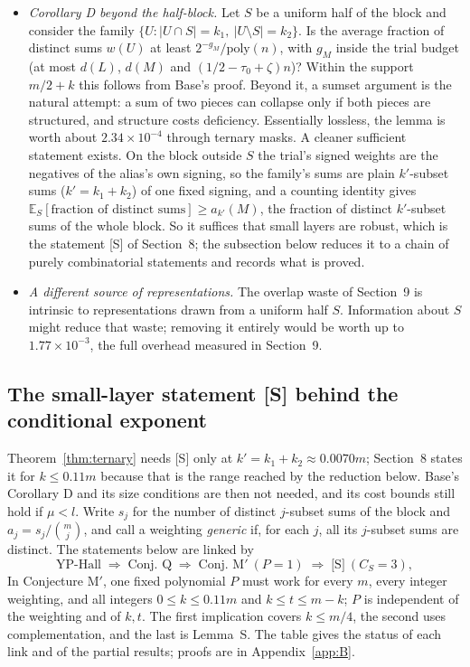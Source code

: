 \documentclass[11pt]{article}
\newcommand{\E}{\mathbb{E}}
\newcommand{\poly}{\mathrm{poly}}
\theoremstyle{plain}
\begin{document}
\begin{itemize}
\item \emph{Corollary D beyond the half-block.} Let $S$ be a uniform half of the block and consider the family $\{U : |U \cap S| = k_1,\ |U \setminus S| = k_2\}$. Is the average fraction of distinct sums $w(U)$ at least $2^{-g_M}/\poly(n)$, with $g_M$ inside the trial budget (at most $d(L)$, $d(M)$ and $(1/2 - \tau_0 + \zeta)n$)? Within the support $m/2 + k$ this follows from Base's proof. Beyond it, a sumset argument is the natural attempt: a sum of two pieces can collapse only if both pieces are structured, and structure costs deficiency. Essentially lossless, the lemma is worth about $2.34\times10^{-4}$ through ternary masks. A cleaner sufficient statement exists. On the block outside $S$ the trial's signed weights are the negatives of the alias's own signing, so the family's sums are plain $k'$-subset sums ($k' = k_1 + k_2$) of one fixed signing, and a counting identity gives $\E_S[\text{fraction of distinct sums}] \ge a_{k'}(M)$, the fraction of distinct $k'$-subset sums of the whole block. So it suffices that small layers are robust, which is the statement [S] of Section~8; the subsection below reduces it to a chain of purely combinatorial statements and records what is proved.
\item \emph{A different source of representations.} The overlap waste of Section~9 is intrinsic to representations drawn from a uniform half $S$. Information about $S$ might reduce that waste; removing it entirely would be worth up to $1.77\times10^{-3}$, the full overhead measured in Section~9.
\end{itemize}

\subsection*{The small-layer statement [S] behind the conditional exponent}

Theorem~\ref{thm:ternary} needs [S] only at $k' = k_1 + k_2 \approx 0.0070m$; Section~8 states it for $k \le 0.11m$ because that is the range reached by the reduction below. Base's Corollary D and its size conditions are then not needed, and its cost bounds still hold if $\mu < l$. Write $s_j$ for the number of distinct $j$-subset sums of the block and $a_j = s_j/\binom{m}{j}$, and call a weighting \emph{generic} if, for each $j$, all its $j$-subset sums are distinct. The statements below are linked by
\[
\text{YP-Hall} \;\Rightarrow\; \text{Conj.~Q} \;\Rightarrow\; \text{Conj.~M}' \ (P = 1) \;\Rightarrow\; \text{[S]} \ (C_S = 3),
\]
In Conjecture M$'$, one fixed polynomial $P$ must work for every $m$, every integer weighting, and all integers $0\le k\le0.11m$ and $k\le t\le m-k$; $P$ is independent of the weighting and of $k,t$. The first implication covers $k\le m/4$, the second uses complementation, and the last is Lemma~S. The table gives the status of each link and of the partial results; proofs are in Appendix~\ref{app:B}.
\end{document}
